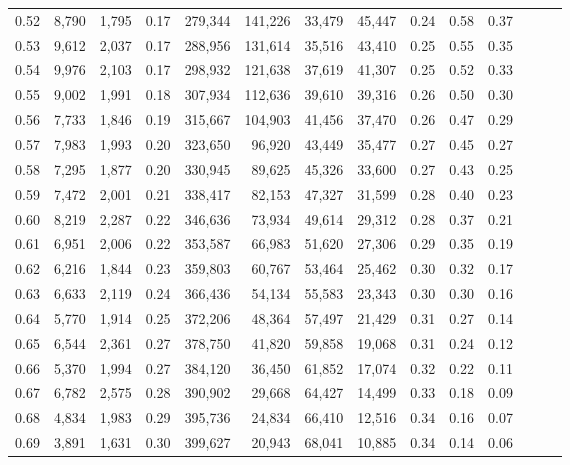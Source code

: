 \begin{tabular}{rrrrrrrrrrrrrr}
0.52 &   8,790 &  1,795 &  0.17 &  279,344 &  141,226 &  33,479 &  45,447 &  0.24 &  0.58 &      0.37 \\
0.53 &   9,612 &  2,037 &  0.17 &  288,956 &  131,614 &  35,516 &  43,410 &  0.25 &  0.55 &      0.35 \\
0.54 &   9,976 &  2,103 &  0.17 &  298,932 &  121,638 &  37,619 &  41,307 &  0.25 &  0.52 &      0.33 \\
0.55 &   9,002 &  1,991 &  0.18 &  307,934 &  112,636 &  39,610 &  39,316 &  0.26 &  0.50 &      0.30 \\
0.56 &   7,733 &  1,846 &  0.19 &  315,667 &  104,903 &  41,456 &  37,470 &  0.26 &  0.47 &      0.29 \\
0.57 &   7,983 &  1,993 &  0.20 &  323,650 &   96,920 &  43,449 &  35,477 &  0.27 &  0.45 &      0.27 \\
0.58 &   7,295 &  1,877 &  0.20 &  330,945 &   89,625 &  45,326 &  33,600 &  0.27 &  0.43 &      0.25 \\
0.59 &   7,472 &  2,001 &  0.21 &  338,417 &   82,153 &  47,327 &  31,599 &  0.28 &  0.40 &      0.23 \\
0.60 &   8,219 &  2,287 &  0.22 &  346,636 &   73,934 &  49,614 &  29,312 &  0.28 &  0.37 &      0.21 \\
0.61 &   6,951 &  2,006 &  0.22 &  353,587 &   66,983 &  51,620 &  27,306 &  0.29 &  0.35 &      0.19 \\
0.62 &   6,216 &  1,844 &  0.23 &  359,803 &   60,767 &  53,464 &  25,462 &  0.30 &  0.32 &      0.17 \\
0.63 &   6,633 &  2,119 &  0.24 &  366,436 &   54,134 &  55,583 &  23,343 &  0.30 &  0.30 &      0.16 \\
0.64 &   5,770 &  1,914 &  0.25 &  372,206 &   48,364 &  57,497 &  21,429 &  0.31 &  0.27 &      0.14 \\
0.65 &   6,544 &  2,361 &  0.27 &  378,750 &   41,820 &  59,858 &  19,068 &  0.31 &  0.24 &      0.12 \\
0.66 &   5,370 &  1,994 &  0.27 &  384,120 &   36,450 &  61,852 &  17,074 &  0.32 &  0.22 &      0.11 \\
0.67 &   6,782 &  2,575 &  0.28 &  390,902 &   29,668 &  64,427 &  14,499 &  0.33 &  0.18 &      0.09 \\
0.68 &   4,834 &  1,983 &  0.29 &  395,736 &   24,834 &  66,410 &  12,516 &  0.34 &  0.16 &      0.07 \\
0.69 &   3,891 &  1,631 &  0.30 &  399,627 &   20,943 &  68,041 &  10,885 &  0.34 &  0.14 &      0.06 \\

\end{tabular}
